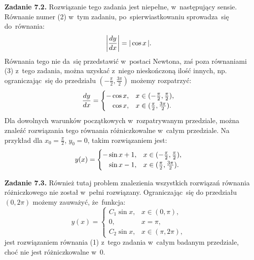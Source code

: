 \documentclass[a4paper,11pt]{article}
\begin{document}
\start {} \textbf{Zadanie 7.2.} Rozwiązanie tego zadania jest
niepełne, w~następujący sensie. Równanie numer (2) w~tym zadaniu,
po~spierwiastkowaniu sprowadza~się do~równania:
\begin{equation}
  \label{eq:KrysickiWlodarskiAnalizaVolII-01}
  \left| \frac{ dy }{ dx } \right| = |\, {  \cos x  } \,|.
\end{equation}
Równania tego nie da~się przedstawić w~postaci Newtona, zaś poza
równaniami (3) z~tego zadania, można uzyskać z~niego nieskończoną
ilość innych, np. ograniczając~się do przedziału
$( -\frac{ \pi }{ 2 }, \frac{ 3 \pi }{ 2 } )$ możemy rozpatrzyć:
\begin{equation}
  \label{eq:KrysickiWlodarskiAnalizaVolII-02}
  \frac{ dy }{ dx } =
  \begin{cases}
    -\cos x, & x \in ( -\frac{ \pi }{ 2 }, \frac{ \pi }{ 2 } ), \\
    \hphantom{-}\cos x,
             & x \in ( \frac{ \pi }{ 2 }, \frac{ 3 \pi }{ 2 } ).
  \end{cases}
\end{equation}
Dla dowolnych warunków początkowych w~rozpatrywanym przedziale, można
znaleźć rozwiązania tego równania różniczkowalne w~całym przedziale.
Na przykład dla $x_{ 0 } = \frac{ \pi }{ 2 }$, $y_{ 0 } = 0$, takim
rozwiązaniem jest:
\begin{equation}
  \label{eq:KrysickiWlodarskiAnalizaVolII-03}
  y( x ) =
  \begin{cases}
    -\sin x + 1, & x \in ( -\frac{ \pi }{ 2 }, \frac{ \pi }{ 2 } ), \\
    \hphantom{-}\sin x - 1,
                 & x \in ( \frac{ \pi }{ 2 }, \frac{ 3 \pi }{ 2 } ).
  \end{cases}
\end{equation}

\vspace{\spaceFour}



\start {} \textbf{Zadanie 7.3.} Również tutaj problem znalezienia
wszystkich rozwiązań równania różniczkowego nie został w~pełni
rozwiązany. Ograniczając~się do przedziału $( 0, 2 \pi )$ możemy
zauważyć, że~funkcja:
\begin{equation}
  \label{eq:KrysickiWlodarskiAnalizaVolII-04}
  y( x ) =
  \begin{cases}
    C_{ 1 } \sin x,& x \in ( 0, \pi ), \\
    0, & x = \pi, \\
    C_{ 2 } \sin x,& x \in ( \pi, 2 \pi ),
  \end{cases}
\end{equation}
jest rozwiązaniem równania (1) z~tego zadania w~całym badanym
przedziale, choć nie jest różniczkowalne w~0.
\end{document}
